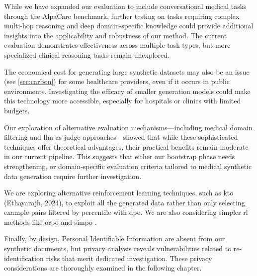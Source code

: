 While we have expanded our evaluation to include conversational medical tasks through the AlpaCare benchmark, further testing on tasks requiring complex multi-hop reasoning and deep domain-specific knowledge could provide additional insights into the applicability and robustness of our method. The current evaluation demonstrates effectiveness across multiple task types, but more specialized clinical reasoning tasks remain unexplored.

The economical cost for generating large synthetic datasets may also be an issue (see \ref{sec:carbon}) for some healthcare providers, even if it occurs in public environments. Investigating the efficacy of smaller generation models could make this technology more accessible, especially for hospitals or clinics with limited budgets.

Our exploration of alternative evaluation mechanisms—including medical domain filtering and \gls{llm}-as-judge approaches—showed that while these sophisticated techniques offer theoretical advantages, their practical benefits remain moderate in our current pipeline. This suggests that either our bootstrap phase needs strengthening, or domain-specific evaluation criteria tailored to medical synthetic data generation require further investigation.

We are exploring alternative reinforcement learning techniques, such as \gls{kto} (Ethayarajh, 2024), to exploit all the generated data rather than only selecting example pairs filtered by percentile with \gls{dpo}. We are also considering simpler \gls{rl} methods like \gls{orpo} \cite{hong2024orpo} and \gls{simpo} \cite{meng2024simpo}.

Finally, by design, Personal Identifiable Information are absent from our synthetic documents, but privacy analysis reveals vulnerabilities related to re-identification risks that merit dedicated investigation. These privacy considerations are thoroughly examined in the following chapter.

